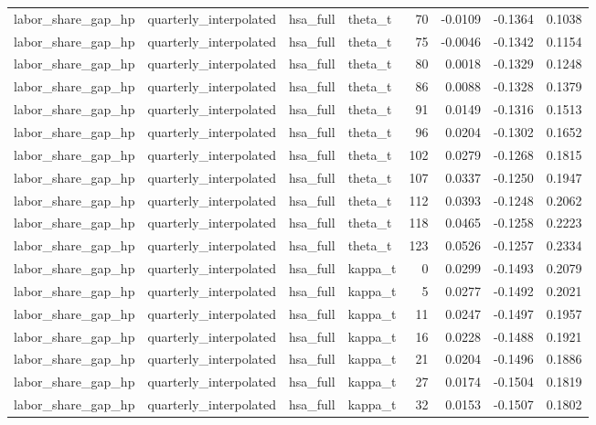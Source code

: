 \begin{tabular}{llllrrrr}
labor\_share\_gap\_hp & quarterly\_interpolated & hsa\_full & theta\_t & 70 & -0.0109 & -0.1364 & 0.1038 \\
labor\_share\_gap\_hp & quarterly\_interpolated & hsa\_full & theta\_t & 75 & -0.0046 & -0.1342 & 0.1154 \\
labor\_share\_gap\_hp & quarterly\_interpolated & hsa\_full & theta\_t & 80 & 0.0018 & -0.1329 & 0.1248 \\
labor\_share\_gap\_hp & quarterly\_interpolated & hsa\_full & theta\_t & 86 & 0.0088 & -0.1328 & 0.1379 \\
labor\_share\_gap\_hp & quarterly\_interpolated & hsa\_full & theta\_t & 91 & 0.0149 & -0.1316 & 0.1513 \\
labor\_share\_gap\_hp & quarterly\_interpolated & hsa\_full & theta\_t & 96 & 0.0204 & -0.1302 & 0.1652 \\
labor\_share\_gap\_hp & quarterly\_interpolated & hsa\_full & theta\_t & 102 & 0.0279 & -0.1268 & 0.1815 \\
labor\_share\_gap\_hp & quarterly\_interpolated & hsa\_full & theta\_t & 107 & 0.0337 & -0.1250 & 0.1947 \\
labor\_share\_gap\_hp & quarterly\_interpolated & hsa\_full & theta\_t & 112 & 0.0393 & -0.1248 & 0.2062 \\
labor\_share\_gap\_hp & quarterly\_interpolated & hsa\_full & theta\_t & 118 & 0.0465 & -0.1258 & 0.2223 \\
labor\_share\_gap\_hp & quarterly\_interpolated & hsa\_full & theta\_t & 123 & 0.0526 & -0.1257 & 0.2334 \\
labor\_share\_gap\_hp & quarterly\_interpolated & hsa\_full & kappa\_t & 0 & 0.0299 & -0.1493 & 0.2079 \\
labor\_share\_gap\_hp & quarterly\_interpolated & hsa\_full & kappa\_t & 5 & 0.0277 & -0.1492 & 0.2021 \\
labor\_share\_gap\_hp & quarterly\_interpolated & hsa\_full & kappa\_t & 11 & 0.0247 & -0.1497 & 0.1957 \\
labor\_share\_gap\_hp & quarterly\_interpolated & hsa\_full & kappa\_t & 16 & 0.0228 & -0.1488 & 0.1921 \\
labor\_share\_gap\_hp & quarterly\_interpolated & hsa\_full & kappa\_t & 21 & 0.0204 & -0.1496 & 0.1886 \\
labor\_share\_gap\_hp & quarterly\_interpolated & hsa\_full & kappa\_t & 27 & 0.0174 & -0.1504 & 0.1819 \\
labor\_share\_gap\_hp & quarterly\_interpolated & hsa\_full & kappa\_t & 32 & 0.0153 & -0.1507 & 0.1802 \\

\end{tabular}
